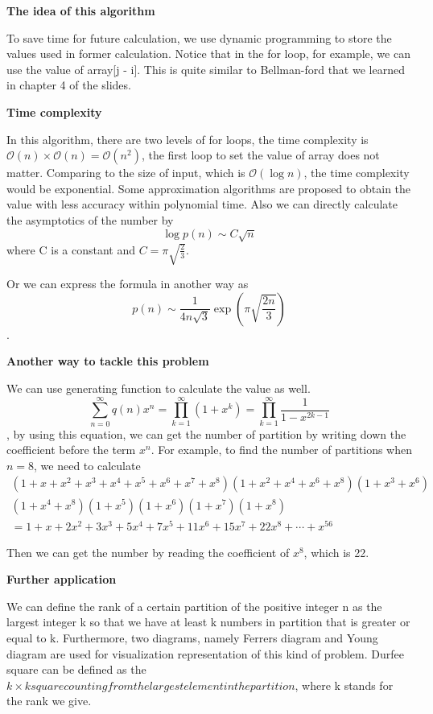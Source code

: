 \documentclass[catalog.tex]{subfiles}
\begin{document}
	\textbf{The idea of this algorithm}

	To save time for future calculation, we use dynamic programming to store the values used in former calculation. Notice that in the for loop, for example, we can use the value of array[j - i]. This is quite similar to Bellman-ford that we learned in chapter 4 of the slides\cite{ve477}.

	\textbf{Time complexity}

	In this algorithm, there are two levels of for loops, the time complexity is $\mathcal{O}(n) \times \mathcal{O}(n) = \mathcal{O}(n^2)$, the first loop to set the value of array does not matter. Comparing to the size of input, which is $\mathcal{O}(\log n)$, the time complexity would be exponential. Some approximation algorithms are proposed to obtain the value with less accuracy within polynomial time. Also we can directly calculate the asymptotics of the number by $$
\log p(n) \sim C \sqrt{n}
$$
where C is a constant and $C=\pi \sqrt{\frac{2}{3}}$\cite{andrews1998theory}. 

Or we can express the formula in another way as $$
p(n) \sim \frac{1}{4 n \sqrt{3}} \exp \left(\pi \sqrt{\frac{2 n}{3}}\right)
$$.


	\textbf{Another way to tackle this problem}

	We can use generating function to calculate the value as well\cite{note}. $$\sum_{n=0}^{\infty} q(n) x^{n}=\prod_{k=1}^{\infty}\left(1+x^{k}\right)=\prod_{k=1}^{\infty} \frac{1}{1-x^{2 k-1}}$$, by using this equation, we can get the number of partition by writing down the coefficient before the term $x^n$. For example, to find the number of partitions when $n = 8$, we need to calculate $$
\begin{array}{c}
\left(1+x+x^{2}+x^{3}+x^{4}+x^{5}+x^{6}+x^{7}+x^{8}\right)\left(1+x^{2}+x^{4}+x^{6}+x^{8}\right)\left(1+x^{3}+x^{6}\right) \\
\left(1+x^{4}+x^{8}\right)\left(1+x^{5}\right)\left(1+x^{6}\right)\left(1+x^{7}\right)\left(1+x^{8}\right) \\
=1+x+2 x^{2}+3 x^{3}+5 x^{4}+7 x^{5}+11 x^{6}+15 x^{7}+22 x^{8}+\cdots+x^{56}
\end{array}
$$

Then we can get the number by reading the coefficient of $x^8$, which is 22.

\textbf{Further application}

We can define the rank of a certain partition of the positive integer n as the largest integer k so that we have at least k numbers in partition that is greater or equal to k. Furthermore, two diagrams, namely Ferrers diagram and Young diagram are used for visualization representation of this kind of problem. Durfee square can be defined as the $k\times k square counting from the largest element in the partition$, where k stands for the rank we give.
\end{document}
